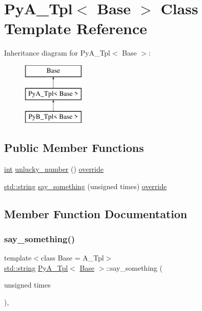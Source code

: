 \hypertarget{class_py_a___tpl}{}\section{Py\+A\+\_\+\+Tpl$<$ Base $>$ Class Template Reference}
\label{class_py_a___tpl}
Inheritance diagram for Py\+A\+\_\+\+Tpl$<$ Base $>$\+:\begin{figure}[H]
\begin{center}
\leavevmode
\includegraphics[height=3.000000cm]{class_py_a___tpl}
\end{center}
\end{figure}
\subsection*{Public Member Functions}
\begin{DoxyCompactItemize}
\item 
\mbox{\hyperlink{warnings_8h_a74f207b5aa4ba51c3a2ad59b219a423b}{int}} \mbox{\hyperlink{class_py_a___tpl_ab1e973a0599fb37d199c7d9f598b56e2}{unlucky\+\_\+number}} () \mbox{\hyperlink{dictobject_8h_a055cf4fd16bde9bce026127362cee1a3}{override}}
\item 
\mbox{\hyperlink{_s_d_l__opengl__glext_8h_ab4ccfaa8ab0e1afaae94dc96ef52dde1}{std\+::string}} \mbox{\hyperlink{class_py_a___tpl_aa94da81468a3fcf60a7e6ac354e0fdcf}{say\+\_\+something}} (unsigned times) \mbox{\hyperlink{dictobject_8h_a055cf4fd16bde9bce026127362cee1a3}{override}}
\end{DoxyCompactItemize}


\subsection{Member Function Documentation}
\mbox{\label{class_py_a___tpl_aa94da81468a3fcf60a7e6ac354e0fdcf}} 
\subsubsection{\texorpdfstring{say\_something()}{say\_something()}}
{\footnotesize\ttfamily template$<$class Base  = A\+\_\+\+Tpl$>$ \\
\mbox{\hyperlink{_s_d_l__opengl__glext_8h_ab4ccfaa8ab0e1afaae94dc96ef52dde1}{std\+::string}} \mbox{\hyperlink{class_py_a___tpl}{Py\+A\+\_\+\+Tpl}}$<$ \mbox{\hyperlink{struct_base}{Base}} $>$\+::say\+\_\+something (\begin{DoxyParamCaption}\item[{unsigned}]{times }\end{DoxyParamCaption})\hspace{0.3cm}{\ttfamily [inline]}, {\ttfamily [override]}}

